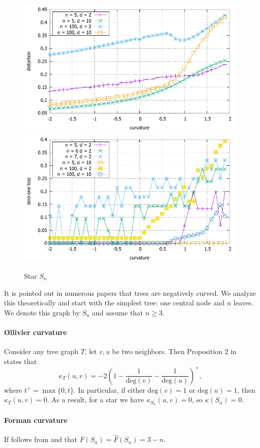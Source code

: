 \documentclass{article} %
\begin{document}
\begin{figure}
    \centering
    \includegraphics[width = 0.49 \textwidth]{star_distortion.pdf}
    \includegraphics[width = 0.49 \textwidth]{star_zero_one.pdf}
    \caption{Star $S_n$}
    \label{fig:star}
\end{figure}

It is pointed out in numerous papers that trees are negatively curved. 
We analyze this theoretically and start with the simplest tree: one central node and $n$ leaves. We denote this graph by $S_n$ and assume that $n \ge 3$.

\paragraph{Ollivier curvature} 
Consider any tree graph $T$, let $v, u$ be two neighbors. Then Proposition 2 in~\citep{jost2014ollivier} states that
\begin{equation}\label{eq:ollivier_tree}
	\kappa_T(u,v) = -2\left(1 - \frac{1}{\mathrm{deg}(v)} - \frac{1}{\mathrm{deg}(u)}\right)^+, 
\end{equation}
where $t^+ = \max\{0,t\}$. In particular, if either $\mathrm{deg}(v) = 1$ or $\mathrm{deg}(u) = 1$, then $\kappa_T(u,v) = 0$.  As a result, for a star we have $\kappa_{S_n}(u,v) = 0$, so $\kappa(S_n) = 0$.

\paragraph{Forman curvature}
If follows from  and  that
$F(S_n) = \hat F(S_n) = 3-n$.

\end{document}
